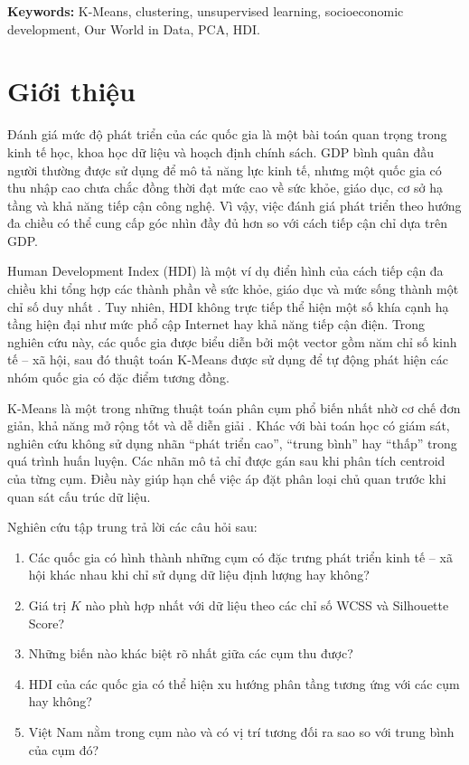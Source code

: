 \documentclass[11pt,a4paper]{article}
\begin{document}
\vspace{0.5em}
\noindent\textbf{Keywords:} K-Means, clustering, unsupervised learning, socioeconomic development, Our World in Data, PCA, HDI.

\section{Giới thiệu}

Đánh giá mức độ phát triển của các quốc gia là một bài toán quan trọng trong kinh tế học, khoa học dữ liệu và hoạch định chính sách. GDP bình quân đầu người thường được sử dụng để mô tả năng lực kinh tế, nhưng một quốc gia có thu nhập cao chưa chắc đồng thời đạt mức cao về sức khỏe, giáo dục, cơ sở hạ tầng và khả năng tiếp cận công nghệ. Vì vậy, việc đánh giá phát triển theo hướng đa chiều có thể cung cấp góc nhìn đầy đủ hơn so với cách tiếp cận chỉ dựa trên GDP.

Human Development Index (HDI) là một ví dụ điển hình của cách tiếp cận đa chiều khi tổng hợp các thành phần về sức khỏe, giáo dục và mức sống thành một chỉ số duy nhất \cite{owid_hdi}. Tuy nhiên, HDI không trực tiếp thể hiện một số khía cạnh hạ tầng hiện đại như mức phổ cập Internet hay khả năng tiếp cận điện. Trong nghiên cứu này, các quốc gia được biểu diễn bởi một vector gồm năm chỉ số kinh tế -- xã hội, sau đó thuật toán K-Means được sử dụng để tự động phát hiện các nhóm quốc gia có đặc điểm tương đồng.

K-Means là một trong những thuật toán phân cụm phổ biến nhất nhờ cơ chế đơn giản, khả năng mở rộng tốt và dễ diễn giải \cite{macqueen1967,lloyd1982}. Khác với bài toán học có giám sát, nghiên cứu không sử dụng nhãn ``phát triển cao'', ``trung bình'' hay ``thấp'' trong quá trình huấn luyện. Các nhãn mô tả chỉ được gán sau khi phân tích centroid của từng cụm. Điều này giúp hạn chế việc áp đặt phân loại chủ quan trước khi quan sát cấu trúc dữ liệu.

Nghiên cứu tập trung trả lời các câu hỏi sau:

\begin{enumerate}
    \item Các quốc gia có hình thành những cụm có đặc trưng phát triển kinh tế -- xã hội khác nhau khi chỉ sử dụng dữ liệu định lượng hay không?
    \item Giá trị $K$ nào phù hợp nhất với dữ liệu theo các chỉ số WCSS và Silhouette Score?
    \item Những biến nào khác biệt rõ nhất giữa các cụm thu được?
    \item HDI của các quốc gia có thể hiện xu hướng phân tầng tương ứng với các cụm hay không?
    \item Việt Nam nằm trong cụm nào và có vị trí tương đối ra sao so với trung bình của cụm đó?
\end{enumerate}
\end{document}
